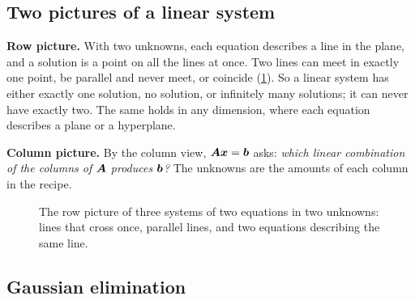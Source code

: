 \subsection{Two pictures of a linear system}

\textbf{Row picture.} With two unknowns, each equation describes a line in the
plane, and a solution is a point on all the lines at once. Two lines can meet
in exactly one point, be parallel and never meet, or coincide
(\cref{fig:systems}). So a linear system has either exactly one solution, no
solution, or infinitely many solutions; it can never have exactly two. The
same holds in any dimension, where each equation describes a plane or a
hyperplane.

\textbf{Column picture.} By the column view, $\bm{A}\bm{x} = \bm{b}$ asks: \emph{which
linear combination of the columns of $\bm{A}$ produces $\bm{b}$?} The unknowns are
the amounts of each column in the recipe.

\begin{figure}[htbp]
\centering
{}
\caption{The row picture of three systems of two equations in two unknowns:
  lines that cross once, parallel lines, and two equations describing the same
  line.}
\label{fig:systems}
\end{figure}

\subsection{Gaussian elimination}

